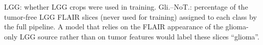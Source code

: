 LGG: whether LGG crops were used in training. Gli.--NoT.: percentage of the tumor-free LGG FLAIR slices (never used for training) assigned to each class by the full pipeline. A model that relies on the FLAIR appearance of the glioma-only LGG source rather than on tumor features would label these slices ``glioma''.
